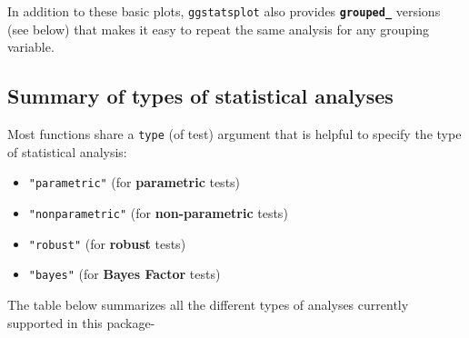 \documentclass[
]{article}
\providecommand{\tightlist}{%
  \setlength{\itemsep}{0pt}\setlength{\parskip}{0pt}}
\begin{document}
In addition to these basic plots, \texttt{ggstatsplot} also provides \textbf{\texttt{grouped\_}}
versions (see below) that makes it easy to repeat the same analysis for
any grouping variable.

\hypertarget{summary-of-types-of-statistical-analyses}{%
\subsection{Summary of types of statistical analyses}\label{summary-of-types-of-statistical-analyses}}

Most functions share a \texttt{type} (of test) argument that is helpful to specify the
type of statistical analysis:

\begin{itemize}
\tightlist
\item
  \texttt{"parametric"} (for \textbf{parametric} tests)
\item
  \texttt{"nonparametric"} (for \textbf{non-parametric} tests)
\item
  \texttt{"robust"} (for \textbf{robust} tests)
\item
  \texttt{"bayes"} (for \textbf{Bayes Factor} tests)
\end{itemize}

The table below summarizes all the different types of analyses
currently supported in this package-
\end{document}
